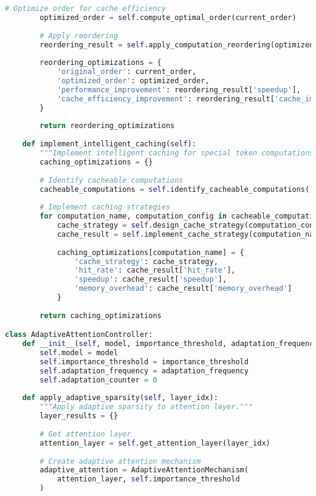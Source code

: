 \begin{lstlisting}[language=Python, caption=Comprehensive computational efficiency optimization framework]
        # Optimize order for cache efficiency
        optimized_order = self.compute_optimal_order(current_order)
        
        # Apply reordering
        reordering_result = self.apply_computation_reordering(optimized_order)
        
        reordering_optimizations = {
            'original_order': current_order,
            'optimized_order': optimized_order,
            'performance_improvement': reordering_result['speedup'],
            'cache_efficiency_improvement': reordering_result['cache_improvement']
        }
        
        return reordering_optimizations
    
    def implement_intelligent_caching(self):
        """Implement intelligent caching for special token computations."""
        caching_optimizations = {}
        
        # Identify cacheable computations
        cacheable_computations = self.identify_cacheable_computations()
        
        # Implement caching strategies
        for computation_name, computation_config in cacheable_computations.items():
            cache_strategy = self.design_cache_strategy(computation_config)
            cache_result = self.implement_cache_strategy(computation_name, cache_strategy)
            
            caching_optimizations[computation_name] = {
                'cache_strategy': cache_strategy,
                'hit_rate': cache_result['hit_rate'],
                'speedup': cache_result['speedup'],
                'memory_overhead': cache_result['memory_overhead']
            }
        
        return caching_optimizations

class AdaptiveAttentionController:
    def __init__(self, model, importance_threshold, adaptation_frequency):
        self.model = model
        self.importance_threshold = importance_threshold
        self.adaptation_frequency = adaptation_frequency
        self.adaptation_counter = 0
        
    def apply_adaptive_sparsity(self, layer_idx):
        """Apply adaptive sparsity to attention layer."""
        layer_results = {}
        
        # Get attention layer
        attention_layer = self.get_attention_layer(layer_idx)
        
        # Create adaptive attention mechanism
        adaptive_attention = AdaptiveAttentionMechanism(
            attention_layer, self.importance_threshold
        )
        

\end{lstlisting}
